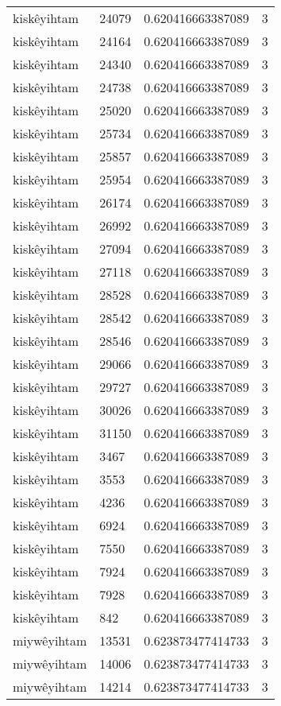 \begin{longtable}{llll}
kiskêyihtam & 24079 & 0.620416663387089 & 3 \\
kiskêyihtam & 24164 & 0.620416663387089 & 3 \\
kiskêyihtam & 24340 & 0.620416663387089 & 3 \\
kiskêyihtam & 24738 & 0.620416663387089 & 3 \\
kiskêyihtam & 25020 & 0.620416663387089 & 3 \\
kiskêyihtam & 25734 & 0.620416663387089 & 3 \\
kiskêyihtam & 25857 & 0.620416663387089 & 3 \\
kiskêyihtam & 25954 & 0.620416663387089 & 3 \\
kiskêyihtam & 26174 & 0.620416663387089 & 3 \\
kiskêyihtam & 26992 & 0.620416663387089 & 3 \\
kiskêyihtam & 27094 & 0.620416663387089 & 3 \\
kiskêyihtam & 27118 & 0.620416663387089 & 3 \\
kiskêyihtam & 28528 & 0.620416663387089 & 3 \\
kiskêyihtam & 28542 & 0.620416663387089 & 3 \\
kiskêyihtam & 28546 & 0.620416663387089 & 3 \\
kiskêyihtam & 29066 & 0.620416663387089 & 3 \\
kiskêyihtam & 29727 & 0.620416663387089 & 3 \\
kiskêyihtam & 30026 & 0.620416663387089 & 3 \\
kiskêyihtam & 31150 & 0.620416663387089 & 3 \\
kiskêyihtam & 3467 & 0.620416663387089 & 3 \\
kiskêyihtam & 3553 & 0.620416663387089 & 3 \\
kiskêyihtam & 4236 & 0.620416663387089 & 3 \\
kiskêyihtam & 6924 & 0.620416663387089 & 3 \\
kiskêyihtam & 7550 & 0.620416663387089 & 3 \\
kiskêyihtam & 7924 & 0.620416663387089 & 3 \\
kiskêyihtam & 7928 & 0.620416663387089 & 3 \\
kiskêyihtam & 842 & 0.620416663387089 & 3 \\
miywêyihtam & 13531 & 0.623873477414733 & 3 \\
miywêyihtam & 14006 & 0.623873477414733 & 3 \\
miywêyihtam & 14214 & 0.623873477414733 & 3 \\

\end{longtable}
